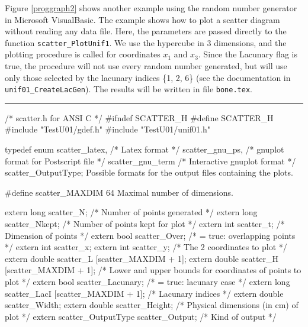 Figure \ref{proggraph2} shows another example using the
random number generator in Microsoft VisualBasic. The example
shows how to plot a scatter diagram without reading any data file.
Here, the parameters are passed directly to the function
{\tt scatter\_PlotUnif1}.
We use the hypercube in 3 dimensions, and the
 plotting procedure is called for coordinates $x_1$ and $x_{3}$.
 Since the Lacunary flag is true,
the procedure will not use every random number generated, but will
use only those selected by the lacunary indices \{1, 2, 6\}
(see the documentation in {\tt unif01\_CreateLacGen}).
The results will be written in file {\tt bone.tex}.

\vspace{10mm}
\bigskip
\hrule
\code
\hide
/* scatter.h  for ANSI C */
#ifndef SCATTER_H
#define SCATTER_H
\endhide
#include "TestU01/gdef.h"
#include "TestU01/unif01.h"
\endcode



\code

typedef enum {
   scatter_latex,                 /* Latex format */
   scatter_gnu_ps,                /* gnuplot format for Postscript file */
   scatter_gnu_term               /* Interactive gnuplot format */
   } scatter_OutputType;
\endcode
 \tab
  Possible formats for the output files containing the plots.
 \endtab


\code

#define scatter_MAXDIM 64
\endcode
 \tab
  Maximal number of dimensions.
 \endtab

\ifdetailed  %

\code

extern long scatter_N;             /* Number of points generated */
extern long scatter_Nkept;         /* Number of points kept for plot */
extern int scatter_t;              /* Dimension of points */
extern bool scatter_Over;        /* = true: overlapping points */
extern int scatter_x;
extern int scatter_y;              /* The 2 coordinates to plot */
extern double scatter_L [scatter_MAXDIM + 1];
extern double scatter_H [scatter_MAXDIM + 1];
                                   /* Lower and upper bounds for coordinates
                                      of points to plot */
\endcode
\code
extern bool scatter_Lacunary;    /* = true: lacunary case */
extern long scatter_LacI [scatter_MAXDIM + 1];  /* Lacunary indices */
extern double scatter_Width;
extern double scatter_Height;      /* Physical dimensions (in cm) of plot */
extern scatter_OutputType scatter_Output;       /* Kind of output */
\endcode

